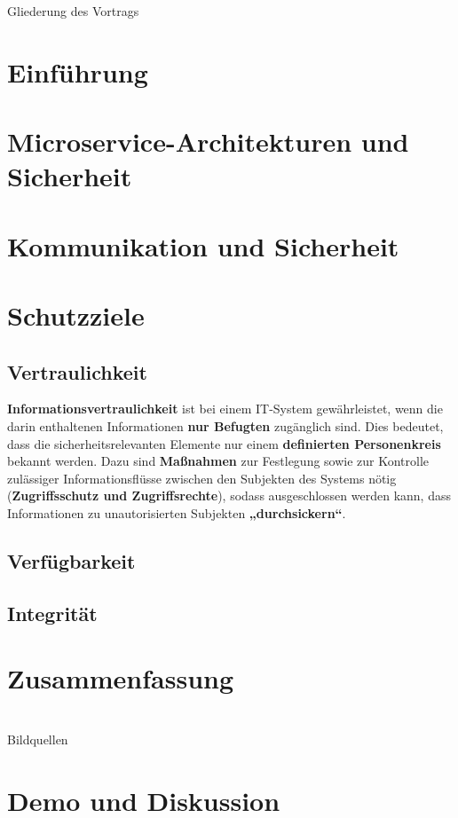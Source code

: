 \documentclass{beamer}
\date{16. Januar 2016}
\def\tocname{Gliederung des Vortrags}
\begin{document}
\fontsize{14pt}{14pt}
	
{
\begin{frame}%
	\titlepage
\end{frame}}

\begin{frame}{\tocname}
	\tableofcontents
\end{frame}

\section{Einführung}
\section{Microservice-Architekturen und Sicherheit}
\section{Kommunikation und Sicherheit}
\section{Schutzziele}

\subsection{Vertraulichkeit}
\begin{frame}{\insertsubsection}
	\textbf{Informationsvertraulichkeit} ist bei einem IT-System gewährleistet, wenn die darin enthaltenen Informationen \textbf{nur Befugten} zugänglich sind. Dies bedeutet, dass die sicherheitsrelevanten Elemente nur einem \textbf{definierten Personenkreis} bekannt werden. Dazu sind \textbf{Maßnahmen} zur Festlegung sowie zur Kontrolle zulässiger Informationsflüsse zwischen den Subjekten des Systems nötig (\textbf{Zugriffsschutz und Zugriffsrechte}), sodass ausgeschlossen werden kann, dass Informationen zu unautorisierten Subjekten \textbf{„durchsickern“}.
\end{frame}
\subsection{Verfügbarkeit}
\subsection{Integrität}


\section{Zusammenfassung}

\section{\bibname}
\begin{frame}[allowframebreaks]{\bibname}
	\AtBeginSection{}
	\nocite{*}
	
	
\end{frame}
\begin{frame}[allowframebreaks]{Bildquellen}
\end{frame}

\section{Demo und Diskussion}
\end{document}
